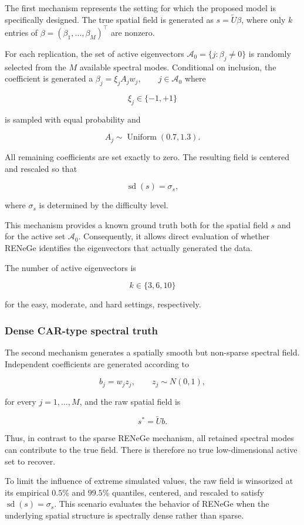 \documentclass[11pt]{article}
\begin{document}
The first mechanism represents the setting for which the proposed model is specifically designed. The true spatial field is generated as $s=\widetilde U\beta$, where only $k$ entries of $\beta=(\beta_1,\ldots,\beta_M)^\top$ are nonzero.

For each replication, the set of active eigenvectors $\mathcal{A}_0= \{j:\beta_j\neq0\}$ is randomly selected from the $M$ available spectral modes. Conditional on inclusion, the coefficient is generated a $\beta_j = \xi_j A_j w_j, \qquad j\in\mathcal{A}_0$ where

\[
\xi_j\in\{-1,+1\}
\]

is sampled with equal probability and

\[
A_j\sim\operatorname{Uniform}(0.7,1.3).
\]

All remaining coefficients are set exactly to zero. The resulting field is centered and rescaled so that

\[
\operatorname{sd}(s)=\sigma_s,
\]

where $\sigma_s$ is determined by the difficulty level.

This mechanism provides a known ground truth both for the spatial field $s$ and for the active set $\mathcal{A}_0$. Consequently, it allows direct evaluation of whether RENeGe identifies the eigenvectors that actually generated the data.

The number of active eigenvectors is

\[
k\in\{3,6,10\}
\]

for the easy, moderate, and hard settings, respectively.

\subsubsection{Dense CAR-type spectral truth}

The second mechanism generates a spatially smooth but non-sparse spectral field. Independent coefficients are generated according to

\[
b_j = w_j z_j,
\qquad
z_j\sim N(0,1),
\]

for every $j=1,\ldots,M$, and the raw spatial field is

\[
s^{\ast}=\widetilde U b.
\]

Thus, in contrast to the sparse RENeGe mechanism, all retained spectral modes can contribute to the true field. There is therefore no true low-dimensional active set to recover.

To limit the influence of extreme simulated values, the raw field is winsorized at its empirical $0.5\%$ and $99.5\%$ quantiles, centered, and rescaled to satisfy $\operatorname{sd}(s)=\sigma_s$. This scenario evaluates the behavior of RENeGe when the underlying spatial structure is spectrally dense rather than sparse.
\end{document}
